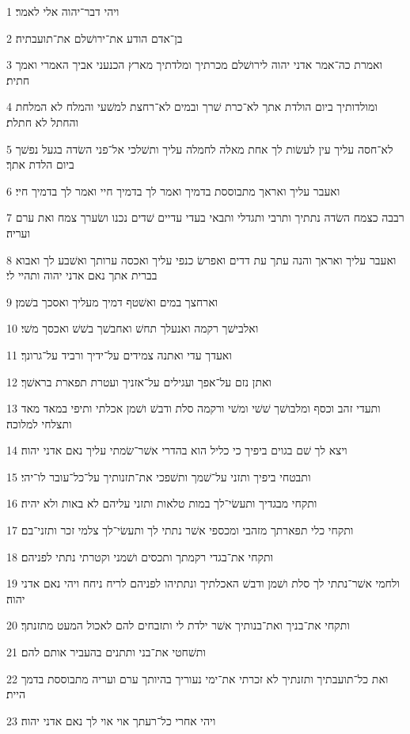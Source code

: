 \par 1 ויהי דבר־יהוה אלי לאמר׃
\par 2 בן־אדם הודע את־ירושׁלם את־תועבתיה׃
\par 3 ואמרת כה־אמר אדני יהוה לירושׁלם מכרתיך ומלדתיך מארץ הכנעני אביך האמרי ואמך חתית׃
\par 4 ומולדותיך ביום הולדת אתך לא־כרת שׁרך ובמים לא־רחצת למשׁעי והמלח לא המלחת והחתל לא חתלת׃
\par 5 לא־חסה עליך עין לעשׂות לך אחת מאלה לחמלה עליך ותשׁלכי אל־פני השׂדה בגעל נפשׁך ביום הלדת אתך׃
\par 6 ואעבר עליך ואראך מתבוססת בדמיך ואמר לך בדמיך חיי ואמר לך בדמיך חיי׃
\par 7 רבבה כצמח השׂדה נתתיך ותרבי ותגדלי ותבאי בעדי עדיים שׁדים נכנו ושׂערך צמח ואת ערם ועריה׃
\par 8 ואעבר עליך ואראך והנה עתך עת דדים ואפרשׂ כנפי עליך ואכסה ערותך ואשׁבע לך ואבוא בברית אתך נאם אדני יהוה ותהיי לי׃
\par 9 וארחצך במים ואשׁטף דמיך מעליך ואסכך בשׁמן׃
\par 10 ואלבישׁך רקמה ואנעלך תחשׁ ואחבשׁך בשׁשׁ ואכסך משׁי׃
\par 11 ואעדך עדי ואתנה צמידים על־ידיך ורביד על־גרונך׃
\par 12 ואתן נזם על־אפך ועגילים על־אזניך ועטרת תפארת בראשׁך׃
\par 13 ותעדי זהב וכסף ומלבושׁך שׁשׁי ומשׁי ורקמה סלת ודבשׁ ושׁמן אכלתי ותיפי במאד מאד ותצלחי למלוכה׃
\par 14 ויצא לך שׁם בגוים ביפיך כי כליל הוא בהדרי אשׁר־שׂמתי עליך נאם אדני יהוה׃
\par 15 ותבטחי ביפיך ותזני על־שׁמך ותשׁפכי את־תזנותיך על־כל־עובר לו־יהי׃
\par 16 ותקחי מבגדיך ותעשׂי־לך במות טלאות ותזני עליהם לא באות ולא יהיה׃
\par 17 ותקחי כלי תפארתך מזהבי ומכספי אשׁר נתתי לך ותעשׂי־לך צלמי זכר ותזני־בם׃
\par 18 ותקחי את־בגדי רקמתך ותכסים ושׁמני וקטרתי נתתי לפניהם׃
\par 19 ולחמי אשׁר־נתתי לך סלת ושׁמן ודבשׁ האכלתיך ונתתיהו לפניהם לריח ניחח ויהי נאם אדני יהוה׃
\par 20 ותקחי את־בניך ואת־בנותיך אשׁר ילדת לי ותזבחים להם לאכול המעט מתזנתך׃
\par 21 ותשׁחטי את־בני ותתנים בהעביר אותם להם׃
\par 22 ואת כל־תועבתיך ותזנתיך לא זכרתי את־ימי נעוריך בהיותך ערם ועריה מתבוססת בדמך היית׃
\par 23 ויהי אחרי כל־רעתך אוי אוי לך נאם אדני יהוה׃
